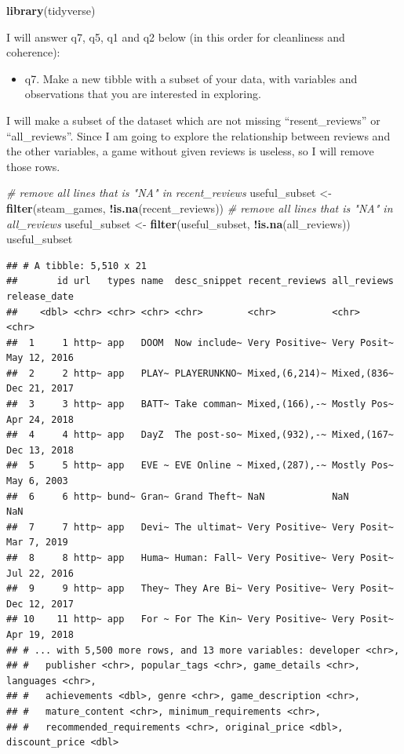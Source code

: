 \documentclass[
]{article}
\newenvironment{Shaded}{\begin{snugshade}}{\end{snugshade}}
\newcommand{\CommentTok}[1]{\textcolor[rgb]{0.56,0.35,0.01}{\textit{#1}}}
\newcommand{\KeywordTok}[1]{\textcolor[rgb]{0.13,0.29,0.53}{\textbf{#1}}}
\newcommand{\NormalTok}[1]{#1}
\newcommand{\OperatorTok}[1]{\textcolor[rgb]{0.81,0.36,0.00}{\textbf{#1}}}
\newcommand{\StringTok}[1]{\textcolor[rgb]{0.31,0.60,0.02}{#1}}
\providecommand{\tightlist}{%
  \setlength{\itemsep}{0pt}\setlength{\parskip}{0pt}}
\begin{document}
\begin{Shaded}
\begin{Highlighting}[]
\KeywordTok{library}\NormalTok{(tidyverse)}
\end{Highlighting}
\end{Shaded}

I will answer q7, q5, q1 and q2 below (in this order for cleanliness and
coherence):

\begin{itemize}
\tightlist
\item
  q7. Make a new tibble with a subset of your data, with variables and
  observations that you are interested in exploring.
\end{itemize}

I will make a subset of the dataset which are not missing
``resent\_reviews'' or ``all\_reviews''. Since I am going to explore the
relationship between reviews and the other variables, a game without
given reviews is useless, so I will remove those rows.

\begin{Shaded}
\begin{Highlighting}[]
\CommentTok{\# remove all lines that is "NA" in recent\_reviews}
\NormalTok{useful\_subset \textless{}{-}}\StringTok{ }\KeywordTok{filter}\NormalTok{(steam\_games, }\OperatorTok{!}\KeywordTok{is.na}\NormalTok{(recent\_reviews))}
\CommentTok{\# remove all lines that is "NA" in all\_reviews}
\NormalTok{useful\_subset \textless{}{-}}\StringTok{ }\KeywordTok{filter}\NormalTok{(useful\_subset, }\OperatorTok{!}\KeywordTok{is.na}\NormalTok{(all\_reviews))}
\NormalTok{useful\_subset}
\end{Highlighting}
\end{Shaded}

\begin{verbatim}
## # A tibble: 5,510 x 21
##       id url   types name  desc_snippet recent_reviews all_reviews release_date
##    <dbl> <chr> <chr> <chr> <chr>        <chr>          <chr>       <chr>       
##  1     1 http~ app   DOOM  Now include~ Very Positive~ Very Posit~ May 12, 2016
##  2     2 http~ app   PLAY~ PLAYERUNKNO~ Mixed,(6,214)~ Mixed,(836~ Dec 21, 2017
##  3     3 http~ app   BATT~ Take comman~ Mixed,(166),-~ Mostly Pos~ Apr 24, 2018
##  4     4 http~ app   DayZ  The post-so~ Mixed,(932),-~ Mixed,(167~ Dec 13, 2018
##  5     5 http~ app   EVE ~ EVE Online ~ Mixed,(287),-~ Mostly Pos~ May 6, 2003 
##  6     6 http~ bund~ Gran~ Grand Theft~ NaN            NaN         NaN         
##  7     7 http~ app   Devi~ The ultimat~ Very Positive~ Very Posit~ Mar 7, 2019 
##  8     8 http~ app   Huma~ Human: Fall~ Very Positive~ Very Posit~ Jul 22, 2016
##  9     9 http~ app   They~ They Are Bi~ Very Positive~ Very Posit~ Dec 12, 2017
## 10    11 http~ app   For ~ For The Kin~ Very Positive~ Very Posit~ Apr 19, 2018
## # ... with 5,500 more rows, and 13 more variables: developer <chr>,
## #   publisher <chr>, popular_tags <chr>, game_details <chr>, languages <chr>,
## #   achievements <dbl>, genre <chr>, game_description <chr>,
## #   mature_content <chr>, minimum_requirements <chr>,
## #   recommended_requirements <chr>, original_price <dbl>, discount_price <dbl>
\end{verbatim}
\end{document}
